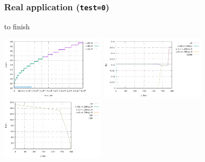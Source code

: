 \subsubsection*{Real application ({\tt test=0})}

{\color{red} to finish}

\begin{center}
\includegraphics[width=5cm]{python_codes/fieldstone_141/results/test0/depth}
\includegraphics[width=5cm]{python_codes/fieldstone_141/results/test0/heat_flux}
\includegraphics[width=5cm]{python_codes/fieldstone_141/results/test0/temperature}
\end{center}





